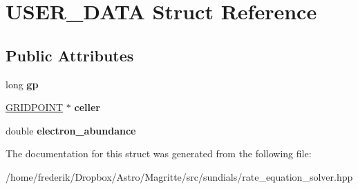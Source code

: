 \hypertarget{structUSER__DATA}{}\section{U\+S\+E\+R\+\_\+\+D\+A\+TA Struct Reference}
\label{structUSER__DATA}
\subsection*{Public Attributes}
\begin{DoxyCompactItemize}
\item 
\mbox{\label{structUSER__DATA_a68317b55e9778bb4145cb932bfeb6ee8}} 
long {\bfseries gp}
\item 
\mbox{\label{structUSER__DATA_a2fbfae29f27a6f8a9a307d2109f80258}} 
\mbox{\hyperlink{structCELLS}{G\+R\+I\+D\+P\+O\+I\+NT}} $\ast$ {\bfseries celler}
\item 
\mbox{\label{structUSER__DATA_a1a2f21156f9834db79f6c40d6a755c8f}} 
double {\bfseries electron\+\_\+abundance}
\end{DoxyCompactItemize}


The documentation for this struct was generated from the following file\+:\begin{DoxyCompactItemize}
\item 
/home/frederik/\+Dropbox/\+Astro/\+Magritte/src/sundials/rate\+\_\+equation\+\_\+solver.\+hpp\end{DoxyCompactItemize}
